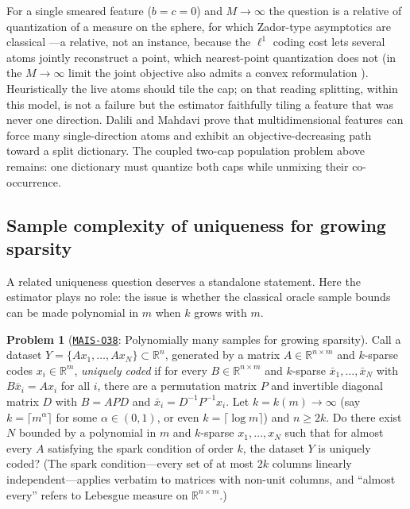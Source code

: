 \documentclass[11pt]{amsart}
\newcommand{\Oid}[1]{\href{https://github.com/lionellevine/MAIS/blob/main/open-problems/MAIS-O#1.md}{\texttt{MAIS-O#1}}}
\theoremstyle{plain}
\theoremstyle{definition}
\newtheorem{problem}[theorem]{Problem}
\newcommand{\R}{\mathbb{R}}
\begin{document}
For a single smeared feature ($b=c=0$) and $M\to\infty$ the question is a relative of quantization of a measure on the sphere, for which Zador-type asymptotics are classical \cite{grafluschgy2000}---a relative, not an instance, because the $\ell^1$ coding cost lets several atoms jointly reconstruct a point, which nearest-point quantization does not (in the $M\to\infty$ limit the joint objective also admits a convex reformulation \cite{bach2008}). Heuristically the live atoms should tile the cap; on that reading splitting, within this model, is not a failure but the estimator faithfully tiling a feature that was never one direction. Dalili and Mahdavi \cite{dalili2026} prove that multidimensional features can force many single-direction atoms and exhibit an objective-decreasing path toward a split dictionary. The coupled two-cap population problem above remains: one dictionary must quantize both caps while unmixing their co-occurrence.

\subsection{Sample complexity of uniqueness for growing sparsity}

A related uniqueness question deserves a standalone statement. Here the estimator plays no role: the issue is whether the classical oracle sample bounds can be made polynomial in $m$ when $k$ grows with $m$.

\begin{problem}[\Oid{38}: Polynomially many samples for growing sparsity]\label{prob:samples}
Call a dataset $Y=\{A x_1,\dots,A x_N\}\subset\R^n$, generated by a matrix $A\in\R^{n\times m}$ and $k$-sparse codes $x_i\in\R^m$, \emph{uniquely coded} if for every $B\in\R^{n\times m}$ and $k$-sparse $\bar x_1,\dots,\bar x_N$ with $B\bar x_i=Ax_i$ for all $i$, there are a permutation matrix $P$ and invertible diagonal matrix $D$ with $B=APD$ and $\bar x_i=D^{-1}P^{-1}x_i$. Let $k=k(m)\to\infty$ (say $k=\lceil m^{\alpha}\rceil$ for some $\alpha\in(0,1)$, or even $k=\lceil\log m\rceil$) and $n\ge 2k$. Do there exist $N$ bounded by a polynomial in $m$ and $k$-sparse $x_1,\dots,x_N$ such that for almost every $A$ satisfying the spark condition of order $k$, the dataset $Y$ is uniquely coded? (The spark condition---every set of at most $2k$ columns linearly independent---applies verbatim to matrices with non-unit columns, and ``almost every'' refers to Lebesgue measure on $\R^{n\times m}$.)
\end{problem}
\end{document}
